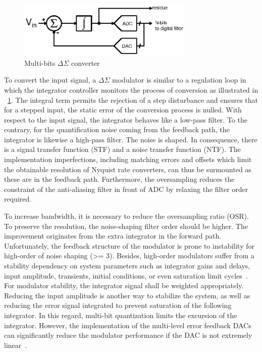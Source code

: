 \begin{figure}[htp]
	\centering
	\includegraphics[width=0.75\textwidth]{Chapter2/Figs/Vector/sigma-delta.ps}
	\caption{Multi-bits $\Delta\Sigma$ converter}
	\label{fig:multi-bit}
\end{figure}

To convert the input signal, a $\Delta\Sigma$ modulator is similar to a regulation loop in which the integrator controller monitors the process of conversion as illustrated in \figurename~\ref{fig:multi-bit}. The integral term permits the rejection of a step disturbance and ensures that for a stepped input, the static error of the conversion process is nulled. With respect to the input signal, the integrator behaves like a low-pass filter. To the contrary, for the quantification noise coming from the feedback path, the integrator is likewise a high-pass filter. The noise is shaped. In consequence, there is a signal transfer function (STF) and a noise transfer function (NTF). The implementation imperfections, including matching errors and offsets which limit the obtainable resolution of Nyquist rate converters, can thus be surmounted as these are in the feedback path. Furthermore, the oversampling reduces the constraint of the anti-aliasing filter in front of ADC by relaxing the filter order required.

To increase bandwidth, it is necessary to reduce the oversampling ratio (OSR). To preserve the resolution, the noise-shaping filter order should be higher. The improvement originates from the extra integrator in the forward path. Unfortunately, the feedback structure of the modulator is prone to instability for high-order of noise shaping (>= 3). Besides, high-order modulators suffer from a stability dependency on system parameters such as integrator gains and delays, input amplitude, transients, initial conditions, or even saturation limit cycles~\cite{Hein1993,Baird1994,Steven1996}. For modulator stability, the integrator signal shall be weighted appropriately. Reducing the input amplitude is another way to stabilize the system, as well as reducing the error signal integrated to prevent saturation of the following integrator. In this regard, multi-bit quantization limits the excursion of the integrator. However, the implementation of the multi-level error feedback DACs can significantly reduce the modulator performance if the DAC is not extremely linear~\cite{Medeiro1999}.


